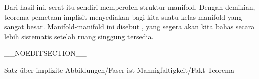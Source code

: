 Dari hasil ini, serat itu sendiri memperoleh struktur manifold. Dengan demikian, teorema pemetaan implisit menyediakan bagi kita suatu kelas manifold yang sangat besar. Manifold-manifold ini disebut  {,} yang segera akan kita bahas secara lebih sistematis setelah ruang singgung tersedia.

__NOEDITSECTION__

{Satz über implizite Abbildungen/Faser ist Mannigfaltigkeit/Fakt}
{Teorema}
{}
{

\faktzusatz {}
\faktzusatz {}

}

